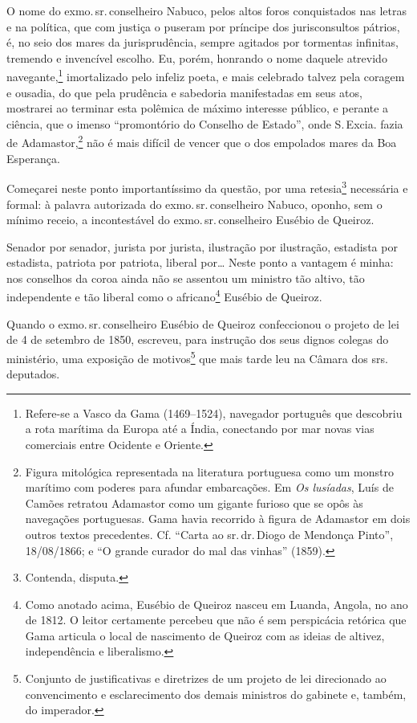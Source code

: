 {O nome do exmo.\,sr.\,conselheiro Nabuco, pelos altos foros conquistados
nas letras e na política, que com justiça o puseram por príncipe dos
jurisconsultos pátrios, é, no seio dos mares da jurisprudência, sempre
agitados por tormentas infinitas, tremendo e invencível escolho. Eu,
porém, honrando o nome daquele atrevido navegante,\footnote{Refere-se a
  Vasco da Gama (1469--1524), navegador português que descobriu a rota
  marítima da Europa até a Índia, conectando por mar novas vias
  comerciais entre Ocidente e Oriente.} imortalizado pelo infeliz
poeta, e mais celebrado talvez pela coragem e ousadia, do que pela
prudência e sabedoria manifestadas em seus atos, mostrarei ao terminar
esta polêmica de máximo interesse público, e perante a ciência, que o
imenso ``promontório do Conselho de Estado'', onde S.\,Excia. fazia de
Adamastor,\footnote{Figura mitológica representada na literatura
  portuguesa como um monstro marítimo com poderes para afundar
  embarcações. Em \emph{Os lusíadas}, Luís de Camões retratou Adamastor
  como um gigante furioso que se opôs às navegações portuguesas. Gama
  havia recorrido à figura de Adamastor em dois outros textos
  precedentes. Cf. ``Carta ao sr.\,dr.\,Diogo de Mendonça Pinto'',
  18/08/1866; e ``O grande curador do mal das vinhas'' (1859).} não
é mais difícil de vencer que o dos empolados mares da Boa Esperança.

Começarei neste ponto importantíssimo da questão, por uma
retesia\footnote{Contenda, disputa.} necessária e formal: à palavra
autorizada do exmo.\,sr.\,conselheiro Nabuco, oponho, sem o mínimo receio,
a incontestável do exmo.\,sr.\,conselheiro Eusébio de Queiroz.

Senador por senador, jurista por jurista, ilustração por ilustração,
estadista por estadista, patriota por patriota, liberal por\ldots{} Neste
ponto a vantagem é minha: nos conselhos da coroa ainda não se assentou
um ministro tão altivo, tão independente e tão liberal como o
africano\footnote{Como anotado acima, Eusébio de Queiroz nasceu em
  Luanda, Angola, no ano de 1812. O leitor certamente percebeu que não é
  sem perspicácia retórica que Gama articula o local de nascimento de
  Queiroz com as ideias de altivez, independência e liberalismo.}
Eusébio de Queiroz.

Quando o exmo.\,sr.\,conselheiro Eusébio de Queiroz confeccionou o projeto
de lei de 4 de setembro de 1850, escreveu, para instrução dos seus
dignos colegas do ministério, uma exposição de motivos\footnote{
  Conjunto de justificativas e diretrizes de um projeto de lei
  direcionado ao convencimento e esclarecimento dos demais ministros do
  gabinete e, também, do imperador.} que mais tarde leu na Câmara dos
srs.\,deputados.

}
